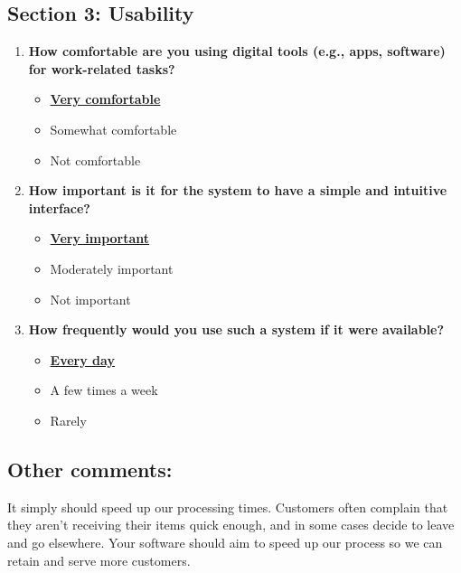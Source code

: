 \subsection*{Section 3: Usability}

\begin{enumerate}
    \item \textbf{How comfortable are you using digital tools (e.g., apps, software) for work-related tasks?}
    \begin{itemize}
        \item \textbf{\underline{Very comfortable}}
        \item Somewhat comfortable
        \item Not comfortable
    \end{itemize}

    \item \textbf{How important is it for the system to have a simple and intuitive interface?}
    \begin{itemize}
        \item \textbf{\underline{Very important}}
        \item Moderately important
        \item Not important
    \end{itemize}

    \item \textbf{How frequently would you use such a system if it were available?}
    \begin{itemize}
        \item \textbf{\underline{Every day}}
        \item A few times a week
        \item Rarely
    \end{itemize}
    
\end{enumerate}


\newpage

\subsection*{Other comments:}

It simply should speed up our processing times. Customers often complain that they aren't receiving their items quick enough, and in some cases decide to leave and go elsewhere. Your software should aim to speed up our process so we can retain and serve more customers.\newline

